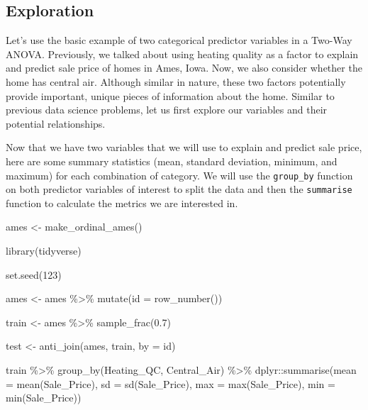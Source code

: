 \documentclass[
  letterpaper,
  DIV=11,
  numbers=noendperiod]{scrreprt}
\newenvironment{Shaded}{\begin{snugshade}}{\end{snugshade}}
\newcommand{\AttributeTok}[1]{\textcolor[rgb]{0.40,0.45,0.13}{#1}}
\newcommand{\DecValTok}[1]{\textcolor[rgb]{0.68,0.00,0.00}{#1}}
\newcommand{\FloatTok}[1]{\textcolor[rgb]{0.68,0.00,0.00}{#1}}
\newcommand{\FunctionTok}[1]{\textcolor[rgb]{0.28,0.35,0.67}{#1}}
\newcommand{\NormalTok}[1]{\textcolor[rgb]{0.00,0.23,0.31}{#1}}
\newcommand{\OtherTok}[1]{\textcolor[rgb]{0.00,0.23,0.31}{#1}}
\newcommand{\SpecialCharTok}[1]{\textcolor[rgb]{0.37,0.37,0.37}{#1}}
\newcommand{\StringTok}[1]{\textcolor[rgb]{0.13,0.47,0.30}{#1}}
\begin{document}
\hypertarget{exploration}{%
\subsection{Exploration}\label{exploration}}

Let's use the basic example of two categorical predictor variables in a
Two-Way ANOVA. Previously, we talked about using heating quality as a
factor to explain and predict sale price of homes in Ames, Iowa. Now, we
also consider whether the home has central air. Although similar in
nature, these two factors potentially provide important, unique pieces
of information about the home. Similar to previous data science
problems, let us first explore our variables and their potential
relationships.

Now that we have two variables that we will use to explain and predict
sale price, here are some summary statistics (mean, standard deviation,
minimum, and maximum) for each combination of category. We will use the
\texttt{group\_by} function on both predictor variables of interest to
split the data and then the \texttt{summarise} function to calculate the
metrics we are interested in.

\begin{Shaded}
\begin{Highlighting}[]
\NormalTok{ames }\OtherTok{\textless{}{-}} \FunctionTok{make\_ordinal\_ames}\NormalTok{()}

\FunctionTok{library}\NormalTok{(tidyverse)}

\FunctionTok{set.seed}\NormalTok{(}\DecValTok{123}\NormalTok{)}

\NormalTok{ames }\OtherTok{\textless{}{-}}\NormalTok{ ames }\SpecialCharTok{\%\textgreater{}\%} \FunctionTok{mutate}\NormalTok{(}\AttributeTok{id =} \FunctionTok{row\_number}\NormalTok{())}

\NormalTok{train }\OtherTok{\textless{}{-}}\NormalTok{ ames }\SpecialCharTok{\%\textgreater{}\%} \FunctionTok{sample\_frac}\NormalTok{(}\FloatTok{0.7}\NormalTok{)}

\NormalTok{test }\OtherTok{\textless{}{-}} \FunctionTok{anti\_join}\NormalTok{(ames, train, }\AttributeTok{by =} \StringTok{\textquotesingle{}id\textquotesingle{}}\NormalTok{)}
\end{Highlighting}
\end{Shaded}

\begin{Shaded}
\begin{Highlighting}[]
\NormalTok{train }\SpecialCharTok{\%\textgreater{}\%} 
  \FunctionTok{group\_by}\NormalTok{(Heating\_QC, Central\_Air) }\SpecialCharTok{\%\textgreater{}\%}
\NormalTok{  dplyr}\SpecialCharTok{::}\FunctionTok{summarise}\NormalTok{(}\AttributeTok{mean =} \FunctionTok{mean}\NormalTok{(Sale\_Price), }
            \AttributeTok{sd =} \FunctionTok{sd}\NormalTok{(Sale\_Price), }
            \AttributeTok{max =} \FunctionTok{max}\NormalTok{(Sale\_Price), }
            \AttributeTok{min =} \FunctionTok{min}\NormalTok{(Sale\_Price))}
\end{Highlighting}
\end{Shaded}
\end{document}
